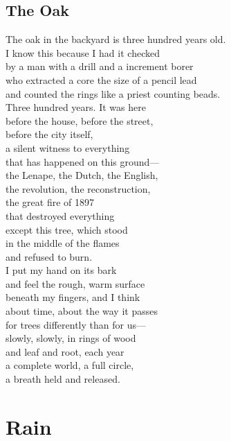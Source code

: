 \documentclass[
    language=english,
    doctype=poetry-collection,
    institution=none,
]{../../omnilatex}
\begin{document}
\begin{center}
\begin{minipage}{0.7\textwidth}
\section*{The Oak}

The oak in the backyard is three hundred years old.\\
I know this because I had it checked\\
by a man with a drill and a increment borer\\
who extracted a core the size of a pencil lead\\
and counted the rings like a priest counting beads.\\

Three hundred years. It was here\\
before the house, before the street,\\
before the city itself,\\
a silent witness to everything\\
that has happened on this ground---\\
the Lenape, the Dutch, the English,\\
the revolution, the reconstruction,\\
the great fire of 1897\\
that destroyed everything\\
except this tree, which stood\\
in the middle of the flames\\
and refused to burn.\\

I put my hand on its bark\\
and feel the rough, warm surface\\
beneath my fingers, and I think\\
about time, about the way it passes\\
for trees differently than for us---\\
slowly, slowly, in rings of wood\\
and leaf and root, each year\\
a complete world, a full circle,\\
a breath held and released.
\end{minipage}
\end{center}

\section*{Rain}
\end{document}
